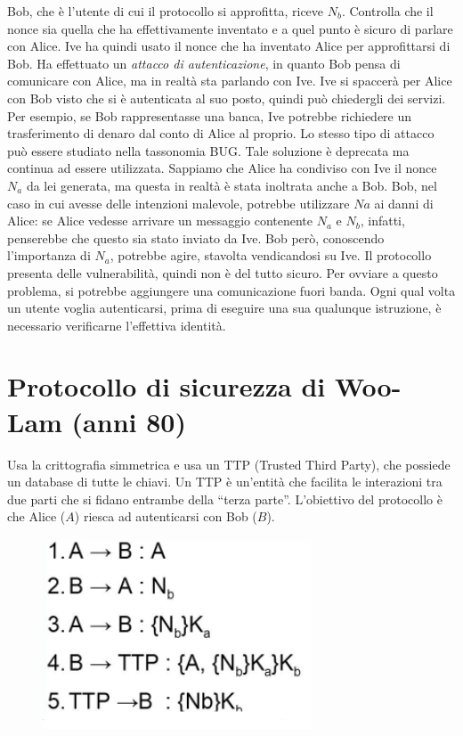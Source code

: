 Bob, che è l'utente di cui il protocollo si approfitta, riceve \(N_b\).
Controlla che il nonce sia quella che
ha effettivamente inventato e a quel punto è sicuro di parlare con Alice.
Ive ha quindi usato il nonce che ha inventato Alice per approfittarsi di
Bob. Ha effettuato un
\textit{attacco di autenticazione}, in quanto Bob pensa di comunicare con
Alice, ma in realtà sta parlando
con Ive.
Ive si spaccerà per Alice con Bob visto che si è autenticata al suo posto,
quindi può chiedergli dei
servizi. Per esempio, se Bob rappresentasse una banca, Ive potrebbe
richiedere un trasferimento
di denaro dal conto di Alice al proprio.
Lo stesso tipo di attacco può essere studiato nella tassonomia BUG. Tale
soluzione è deprecata
ma continua ad essere utilizzata.
Sappiamo che Alice ha condiviso con Ive il nonce \(N_a\) da lei generata, ma
questa in realtà è stata
inoltrata anche a Bob. Bob, nel caso in cui avesse delle intenzioni
malevole, potrebbe utilizzare \(Na\)
ai danni di Alice: se Alice vedesse arrivare un messaggio contenente \(N_a\)
e \(N_b\), infatti, penserebbe
che questo sia stato inviato da Ive. Bob però, conoscendo l'importanza di
\(N_a\), potrebbe agire,
stavolta vendicandosi su Ive.
Il protocollo presenta delle vulnerabilità, quindi non è del tutto sicuro.
Per ovviare a questo
problema, si potrebbe aggiungere una comunicazione fuori banda. Ogni qual
volta un utente voglia
autenticarsi, prima di eseguire una sua qualunque istruzione, è necessario
verificarne l'effettiva
identità.

\section{Protocollo di sicurezza di Woo-Lam (anni 80)}

Usa la crittografia simmetrica e usa un TTP (Trusted Third Party), che
possiede un database di
tutte le chiavi. Un TTP è un'entità che facilita le interazioni tra due
parti che si fidano entrambe
della “terza parte”.
L'obiettivo del protocollo è che Alice (\(A\)) riesca ad autenticarsi
con Bob (\(B\)).

\begin{figure}[H]
    \centering
    \includegraphics[width=8cm, keepaspectratio]{capitoli/crittografia/imgs/Mulan.png}
\end{figure}

